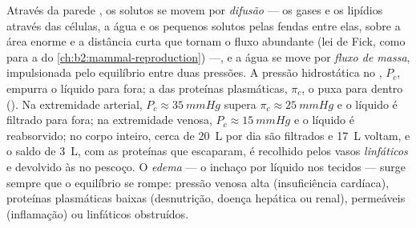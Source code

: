 \begin{proposition}\label{prop:b2:blood-circulation:exchange}
Através da parede , os solutos se movem por \emph{difusão} ---
os gases e os lipídios através das células, a água e os pequenos
solutos pelas fendas entre elas, sobre a área enorme e a distância curta
que tornam o fluxo abundante (lei de Fick, como para a  do
\cref{ch:b2:mammal-reproduction}) ---, e a água se move por \emph{fluxo de massa}, impulsionada
pelo equilíbrio entre duas pressões. A pressão hidrostática no
, $P_c$, empurra o líquido para fora; a  das
proteínas plasmáticas, $\pi_c$, o puxa para dentro (\emph{}). Na extremidade arterial, $P_c \approx
\qty{35}{mmHg}$ supera $\pi_c \approx \qty{25}{mmHg}$ e o líquido é
filtrado para fora; na extremidade venosa, $P_c \approx \qty{15}{mmHg}$
e o líquido é reabsorvido; no corpo inteiro, cerca de \qty{20}{L} por
dia são filtrados e \qty{17}{L} voltam, e o saldo de \qty{3}{L}, com as
proteínas que escaparam, é recolhido pelos vasos \emph{linfáticos} e
devolvido às  no pescoço. O \emph{edema} --- o inchaço por líquido
nos tecidos --- surge sempre que o equilíbrio se rompe: pressão venosa
alta (insuficiência cardíaca), proteínas plasmáticas baixas (desnutrição,
doença hepática ou renal),  permeáveis (inflamação) ou
linfáticos obstruídos.
\end{proposition}

